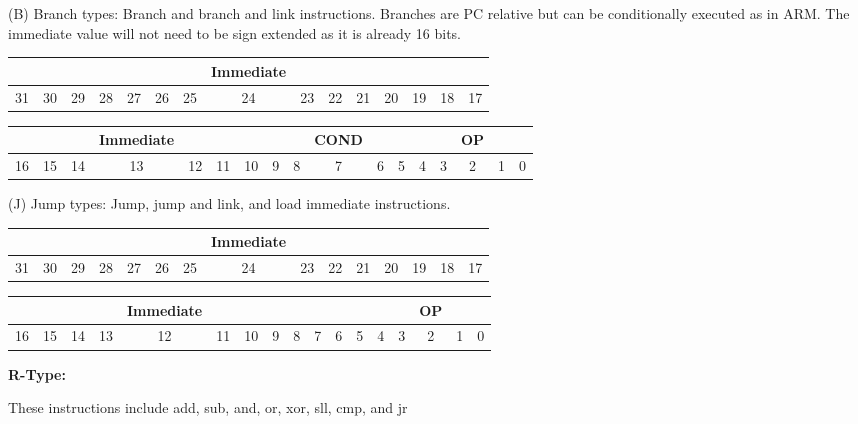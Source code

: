 \documentclass[]{article}
\begin{document}
\vspace{8mm}

\noindent (B) Branch types: Branch and branch and link instructions.  Branches are PC relative but can be conditionally executed as in ARM.  The immediate value will not need to be sign extended as it is already 16 bits.

\begin{tabular}{|ccccccccccccccc|}\hline
  &  &  &  &  &  &  & Immediate & &  &  &  & &  &\\\hline
31&30&29&28&27&26&25&24&23&22&21&20&19&18&17\\\hline
\end{tabular}

\begin{tabular}{|cccccccc|cccc|ccccc|}\hline
	&  & & Immediate & &  & & & & COND & & & & & OP & & \\\hline
16&15&14&13&12&11&10&9&8&7&6&5&4&3&2&1&0\\\hline
\end{tabular}

\vspace{8mm}

\noindent (J) Jump types: Jump, jump and link, and load immediate instructions.

\begin{tabular}{|ccccccccccccccc|}\hline
  &  &  &  &  &  &  & Immediate & &  &  &  & &  &\\\hline
31&30&29&28&27&26&25&24&23&22&21&20&19&18&17\\\hline
\end{tabular}

\begin{tabular}{|cccccccccccc|ccccc|}\hline
	&  & & & Immediate &  & & & & & & & & & OP & & \\\hline
16&15&14&13&12&11&10&9&8&7&6&5&4&3&2&1&0\\\hline
\end{tabular}

\pagebreak

{\Large
	\textbf{
		R-Type:
	}
}

\noindent These instructions include add, sub, and, or, xor, sll, cmp, and jr
\end{document}
